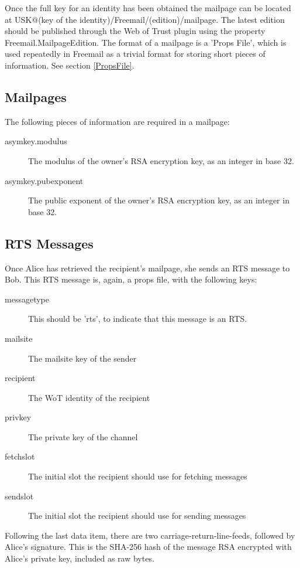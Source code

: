 \documentclass[12pt,a4paper]{article}
\begin{document}

Once the full key for an identity has been obtained the mailpage can be located at
USK@(key of the identity)/Freemail/(edition)/mailpage. The latest edition should be published
through the Web of Trust plugin using the property Freemail.MailpageEdition. The format of a
mailpage is a 'Props File', which is used repeatedly in Freemail as a trivial format for storing
short pieces of information. See section \ref{PropsFile}.

\subsection{Mailpages}
The following pieces of information are required in a mailpage:

\begin{description}
\item[asymkey.modulus] The modulus of the owner's RSA encryption key, as an integer in base 32.
\item[asymkey.pubexponent] The public exponent of the owner's RSA encryption key, as an integer in
	base 32.
\end{description}

\subsection{RTS Messages}
Once Alice has retrieved the recipient's mailpage, she sends an RTS message to Bob. This RTS message
is, again, a props file, with the following keys:

\begin{description}
\item[messagetype] This should be 'rts', to indicate that this message is an RTS.
\item[mailsite] The mailsite key of the sender
\item[recipient] The WoT identity of the recipient
\item[privkey] The private key of the channel
\item[fetchslot] The initial slot the recipient should use for fetching messages
\item[sendslot] The initial slot the recipient should use for sending messages
\end{description}

Following the last data item, there are two carriage-return-line-feeds, followed by Alice's
signature. This is the SHA-256 hash of the message RSA encrypted with Alice's private key, included
as raw bytes.
\end{document}
